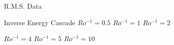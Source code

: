 \documentclass{beamer}
\begin{document}
\begin{frame}{R.M.S. Data}
\end{frame}

\begin{frame}{Inverse Energy Cascade}
        \centering
        $Ro^{-1} = 0.5$
    \emp
        \centering
        $Ro^{-1} = 1$
    \emp
        \centering
        $Ro^{-1} = 2$
    \emp
    
        \centering
        $Ro^{-1} = 4$
    \emp
        \centering
        $Ro^{-1} = 5$
    \emp
        \centering
        $Ro^{-1} = 10$
    \emp

\end{frame}




\end{document}

